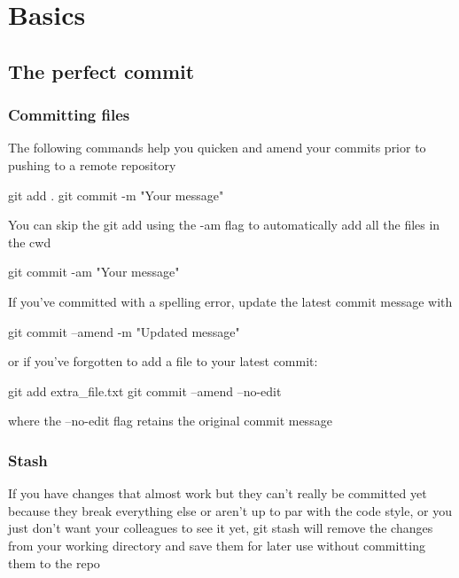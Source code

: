 \chapter{Basics}

\section{The perfect commit}




\subsection{Committing files}

The following commands help you quicken and amend your commits prior to pushing to a remote repository

\begin{console}
    git add .
    git commit -m "Your message"
\end{console}

You can skip the git add using the -am flag to automatically add all the files in the cwd

\begin{console}
    git commit -am "Your message"
\end{console}

If you've committed with a spelling error, update the latest commit message with

\begin{console}
    git commit --amend -m "Updated message"
\end{console}

or if you've forgotten to add a file to your latest commit:

\begin{console}
    git add extra_file.txt
    git commit --amend --no-edit
\end{console}

where the --no-edit flag retains the original commit message



\subsection{Stash}

If you have changes that almost work but they can't really be committed yet because they break everything else or aren't up to par with the code style, or you just don't want your colleagues to see it yet, git stash will remove the changes from your working directory and save them for later use without committing them to the repo

